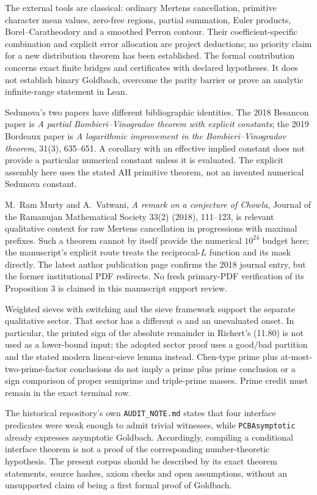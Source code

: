 \documentclass[11pt,a4paper]{article}
\theoremstyle{definition}
\theoremstyle{remark}
\begin{document}
The external tools are classical: ordinary Mertens cancellation,
primitive character mean values, zero-free regions, partial summation,
Euler products, Borel--Caratheodory and a smoothed Perron contour.
Their coefficient-specific combination and explicit error allocation are
project deductions; no priority claim for a new distribution theorem
has been established. The formal contribution concerns exact finite
bridges and certificates with declared hypotheses. It does not establish
binary Goldbach, overcome the parity barrier or prove an analytic
infinite-range statement in Lean.

Sedunova's two papers have different bibliographic identities. The
2018 Besancon paper is \emph{A partial Bombieri--Vinogradov theorem
with explicit constants}; the 2019 Bordeaux paper \cite{Sedunova} is
\emph{A logarithmic improvement in the Bombieri--Vinogradov theorem},
31(3), 635--651. A corollary with an effective implied constant does
not provide a particular numerical constant unless it is evaluated.
The explicit assembly here uses the stated AH primitive theorem,
not an invented numerical Sedunova constant.

M.~Ram Murty and A.~Vatwani, \emph{A remark on a conjecture of Chowla},
Journal of the Ramanujan Mathematical Society 33(2) (2018), 111--123,
is relevant qualitative context for raw
Mertens cancellation in progressions with maximal prefixes. Such a
theorem cannot by itself provide the numerical $10^{24}$ budget here;
the manuscript's explicit route treats the reciprocal-$L$ function
and its mask directly. The latest author publication page confirms
the 2018 journal entry, but the former institutional PDF redirects.
No fresh primary-PDF verification of its Proposition 3 is claimed in
this manuscript support review.

Weighted sieves with switching \cite{MTZ} and the sieve framework
\cite{Richert} support the separate qualitative sector. That sector
has a different $\alpha$ and an unevaluated onset. In particular, the
printed sign of the absolute remainder in Richert's (11.80) is not
used as a lower-bound input; the adopted sector proof uses a good/bad
partition and the stated modern linear-sieve lemma instead. Chen-type
prime plus at-most-two-prime-factor conclusions do not imply a prime
plus prime conclusion or a sign comparison of proper semiprime and
triple-prime masses. Prime credit must remain in the exact terminal row.

The historical repository's own \texttt{AUDIT\_NOTE.md} states that
four interface predicates were weak enough to admit trivial witnesses,
while \texttt{PCBAsymptotic} already expresses asymptotic Goldbach.
Accordingly, compiling a conditional interface theorem is not a proof
of the corresponding number-theoretic hypothesis. The present corpus
should be described by its exact theorem statements, source hashes,
axiom checks and open assumptions, without an unsupported claim of
being a first formal proof of Goldbach.
\end{document}

